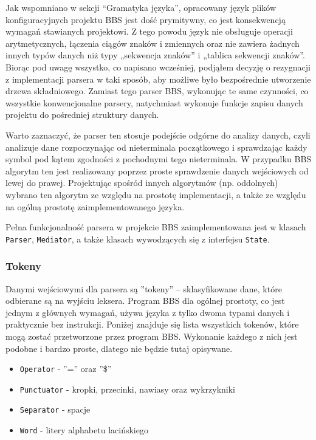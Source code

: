 Jak wspomniano w sekcji ``Gramatyka języka'', opracowany język plików konfiguracyjnych projektu BBS jest dość prymitywny, co jest konsekwencją wymagań stawianych projektowi. Z tego powodu język nie obsługuje operacji arytmetycznych, łączenia ciągów znaków i zmiennych oraz nie zawiera żadnych innych typów danych niż typy „sekwencja znaków” i „tablica sekwencji znaków”. Biorąc pod uwagę wszystko, co napisano wcześniej, podjąłem decyzję o rezygnacji z implementacji parsera w taki sposób, aby możliwe było bezpośrednie utworzenie drzewa składniowego. Zamiast tego parser BBS, wykonując te same czynności, co wszystkie konwencjonalne parsery, natychmiast wykonuje funkcje zapisu danych projektu do pośredniej struktury danych.

Warto zaznaczyć, że parser ten stosuje podejście odgórne do analizy danych, czyli analizuje dane rozpoczynając od nieterminala początkowego i sprawdzając każdy symbol pod kątem zgodności z pochodnymi tego nieterminala. W przypadku BBS algorytm ten jest realizowany poprzez proste sprawdzenie danych wejściowych od lewej do prawej. Projektując spośród innych algorytmów (np. oddolnych) wybrano ten algorytm ze względu na prostotę implementacji, a także ze względu na ogólną prostotę zaimplementowanego języka.

Pełna funkcjonalność parsera w projekcie BBS zaimplementowana jest w klasach \texttt{Parser}, \texttt{Mediator}, a także klasach wywodzących się z interfejsu \texttt{State}.

\subsubsection{Tokeny}

Danymi wejściowymi dla parsera są ''tokeny'' -- sklasyfikowane dane, które odbierane są na wyjściu leksera. Program BBS dla ogólnej prostoty, co jest jednym z głównych wymagań, używa języka z tylko dwoma typami danych i praktycznie bez instrukcji. Poniżej znajduje się lista wszystkich tokenów, które mogą zostać przetworzone przez program BBS. Wykonanie każdego z nich jest podobne i bardzo proste, dlatego nie będzie tutaj opisywane.

\begin{itemize}
	\item \texttt{Operator} - ''='' oraz ''\$''
	\item \texttt{Punctuator} - kropki, przecinki, nawiasy oraz wykrzykniki
	\item \texttt{Separator} - spacje
	\item \texttt{Word} - litery alphabetu lacińskiego
\end{itemize}

